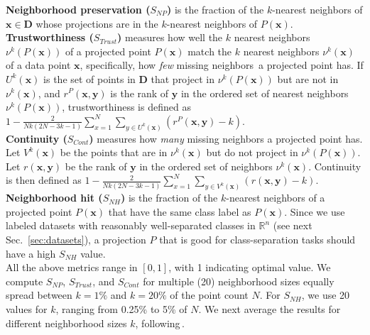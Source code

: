 \noindent\textbf{Neighborhood preservation ($S_{NP}$)} is the fraction of the $k$-nearest neighbors of $\mathbf{x} \in \mathbf{D}$ whose projections are in the $k$-nearest neighbors of $P(\mathbf{x})$.\\

\noindent\textbf{Trustworthiness ($S_{Trust}$)} measures how well the $k$ nearest neighbors $\nu^k(P(\mathbf{x}))$ of a projected point $P(\mathbf{x})$ match the $k$ nearest neighbors $\nu^k(\mathbf{x})$ of a data point $\mathbf{x}$, specifically, how \emph{few} missing neighbors\,\citep{Martins2014} a projected point has. If $U^k(\mathbf{x})$ is the set of points in $\mathbf{D}$ that project in $\nu^k(P(\mathbf{x}))$ but are not in $\nu^k(\mathbf{x})$,
and $r^P(\mathbf{x},\mathbf{y})$ is the rank of $\mathbf{y}$ in the ordered set of nearest neighbors $\nu^k(P(\mathbf{x}))$, trustworthiness is defined as \linebreak
$1-\frac{2}{N k(2 N-3 k-1)} \sum_{x=1}^{N} \sum_{y \in U^k(\mathbf{x})}(r^P(\mathbf{x}, \mathbf{y})-k)$.\\

\noindent\textbf{Continuity ($S_{Cont}$)} measures how \emph{many} missing neighbors a projected point has. Let $V^k(\mathbf{x})$
be the points that are in $\nu^k(\mathbf{x})$ but do not project in $\nu^k(P(\mathbf{x}))$. Let ${r}(\mathbf{x}, \mathbf{y})$ be the rank of $\mathbf{y}$ in the ordered set of neighbors $\nu^k(\mathbf{x})$. Continuity is then defined as \linebreak
$1-\frac{2}{N k(2 N-3 k-1)} \sum_{x=1}^{N} \sum_{y \in V^k(\mathbf{x})}({r}(\mathbf{x}, \mathbf{y})-k)$.\\

\noindent\textbf{Neighborhood hit ($S_{NH}$)} is the fraction of the $k$-nearest neighbors of a projected point $P(\mathbf{x})$ that have the same class label as $P(\mathbf{x})$. Since we use labeled datasets with reasonably well-separated classes in $\mathbb{R}^n$ (see next Sec.~\ref{sec:datasets}), a projection $P$ that is good for class-separation tasks should have a high $S_{NH}$ value.\\

All the above metrics range in $[0,1]$, with 1 indicating optimal value. 
We compute $S_{NP}$, $S_{Trust}$, and $S_{Cont}$ for multiple (20) neighborhood sizes equally spread between $k=1\%$ and $k=20\%$ of the point count $N$. For $S_{NH}$, we use 20 values for $k$, ranging from 0.25\% to 5\% of $N$. 
We next average the results for different neighborhood sizes $k$, following\,\citep{Vernier2020,Martins2015}.\\


